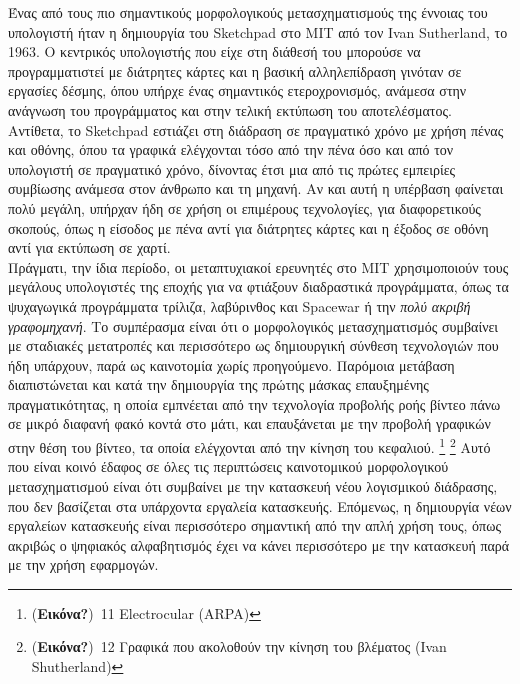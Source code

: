 \documentclass[
]{article}
\begin{document}
Ένας από τους πιο σημαντικούς μορφολογικούς μετασχηματισμούς της έννοιας
του υπολογιστή ήταν η δημιουργία του Sketchpad στο MIT από τον Ivan
Sutherland, το 1963. Ο κεντρικός υπολογιστής που είχε στη διάθεσή του
μπορούσε να προγραμματιστεί με διάτρητες κάρτες και η βασική
αλληλεπίδραση γινόταν σε εργασίες δέσμης, όπου υπήρχε ένας σημαντικός
ετεροχρονισμός, ανάμεσα στην ανάγνωση του προγράμματος και στην τελική
εκτύπωση του αποτελέσματος. Αντίθετα, το Sketchpad εστιάζει στη διάδραση
σε πραγματικό χρόνο με χρήση πένας και οθόνης, όπου τα γραφικά
ελέγχονται τόσο από την πένα όσο και από τον υπολογιστή σε πραγματικό
χρόνο, δίνοντας έτσι μια από τις πρώτες εμπειρίες συμβίωσης ανάμεσα στον
άνθρωπο και τη μηχανή. Αν και αυτή η υπέρβαση φαίνεται πολύ μεγάλη,
υπήρχαν ήδη σε χρήση οι επιμέρους τεχνολογίες, για διαφορετικούς
σκοπούς, όπως η είσοδος με πένα αντί για διάτρητες κάρτες και η έξοδος
σε οθόνη αντί για εκτύπωση σε χαρτί.\\
Πράγματι, την ίδια περίοδο, οι μεταπτυχιακοί ερευνητές στο MIT
χρησιμοποιούν τους μεγάλους υπολογιστές της εποχής για να φτιάξουν
διαδραστικά προγράμματα, όπως τα ψυχαγωγικά προγράμματα τρίλιζα,
λαβύρινθος και Spacewar ή την \emph{πολύ ακριβή γραφομηχανή}. Το
συμπέρασμα είναι ότι ο μορφολογικός μετασχηματισμός συμβαίνει με
σταδιακές μετατροπές και περισσότερο ως δημιουργική σύνθεση τεχνολογιών
που ήδη υπάρχουν, παρά ως καινοτομία χωρίς προηγούμενο. Παρόμοια
μετάβαση διαπιστώνεται και κατά την δημιουργία της πρώτης μάσκας
επαυξημένης πραγματικότητας, η οποία εμπνέεται από την τεχνολογία
προβολής ροής βίντεο πάνω σε μικρό διαφανή φακό κοντά στο μάτι, και
επαυξάνεται με την προβολή γραφικών στην θέση του βίντεο, τα οποία
ελέγχονται από την κίνηση του κεφαλιού. \footnote{(\textbf{Εικόνα?})~11
  Electrocular (ARPA)} \footnote{(\textbf{Εικόνα?})~12 Γραφικά που
  ακολοθούν την κίνηση του βλέματος (Ivan Shutherland)} Αυτό που είναι
κοινό έδαφος σε όλες τις περιπτώσεις καινοτομικού μορφολογικού
μετασχηματισμού είναι ότι συμβαίνει με την κατασκευή νέου λογισμικού
διάδρασης, που δεν βασίζεται στα υπάρχοντα εργαλεία κατασκευής.
Επόμενως, η δημιουργία νέων εργαλείων κατασκευής είναι περισσότερο
σημαντική από την απλή χρήση τους, όπως ακριβώς ο ψηφιακός αλφαβητισμός
έχει να κάνει περισσότερο με την κατασκευή παρά με την χρήση εφαρμογών.
\end{document}
